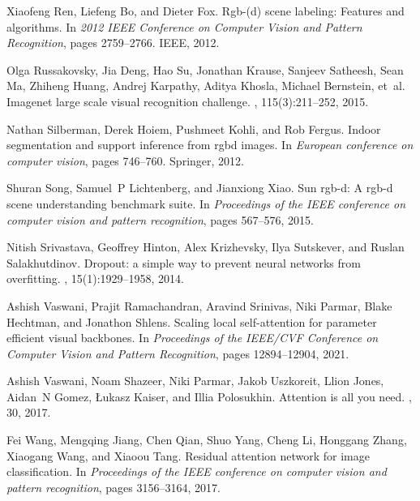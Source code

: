 \documentclass[10pt,twocolumn,letterpaper]{article}
\begin{document}
\begin{thebibliography}{10}
Xiaofeng Ren, Liefeng Bo, and Dieter Fox.
\newblock Rgb-(d) scene labeling: Features and algorithms.
\newblock In {\em 2012 IEEE Conference on Computer Vision and Pattern
  Recognition}, pages 2759--2766. IEEE, 2012.

Olga Russakovsky, Jia Deng, Hao Su, Jonathan Krause, Sanjeev Satheesh, Sean Ma,
  Zhiheng Huang, Andrej Karpathy, Aditya Khosla, Michael Bernstein, et~al.
\newblock Imagenet large scale visual recognition challenge.
, 115(3):211--252,
  2015.

Nathan Silberman, Derek Hoiem, Pushmeet Kohli, and Rob Fergus.
\newblock Indoor segmentation and support inference from rgbd images.
\newblock In {\em European conference on computer vision}, pages 746--760.
  Springer, 2012.

Shuran Song, Samuel~P Lichtenberg, and Jianxiong Xiao.
\newblock Sun rgb-d: A rgb-d scene understanding benchmark suite.
\newblock In {\em Proceedings of the IEEE conference on computer vision and
  pattern recognition}, pages 567--576, 2015.

Nitish Srivastava, Geoffrey Hinton, Alex Krizhevsky, Ilya Sutskever, and Ruslan
  Salakhutdinov.
\newblock Dropout: a simple way to prevent neural networks from overfitting.
, 15(1):1929--1958,
  2014.

Ashish Vaswani, Prajit Ramachandran, Aravind Srinivas, Niki Parmar, Blake
  Hechtman, and Jonathon Shlens.
\newblock Scaling local self-attention for parameter efficient visual
  backbones.
\newblock In {\em Proceedings of the IEEE/CVF Conference on Computer Vision and
  Pattern Recognition}, pages 12894--12904, 2021.

Ashish Vaswani, Noam Shazeer, Niki Parmar, Jakob Uszkoreit, Llion Jones,
  Aidan~N Gomez, {\L}ukasz Kaiser, and Illia Polosukhin.
\newblock Attention is all you need.
, 30, 2017.

Fei Wang, Mengqing Jiang, Chen Qian, Shuo Yang, Cheng Li, Honggang Zhang,
  Xiaogang Wang, and Xiaoou Tang.
\newblock Residual attention network for image classification.
\newblock In {\em Proceedings of the IEEE conference on computer vision and
  pattern recognition}, pages 3156--3164, 2017.


\end{thebibliography}
\end{document}
